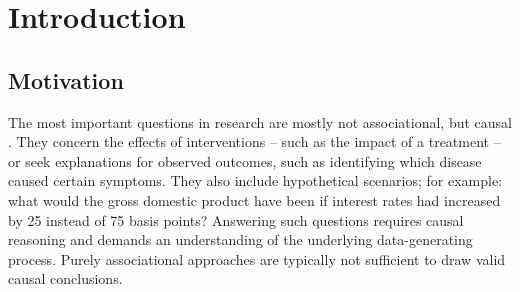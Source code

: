 




\chapter{Introduction}

\section{Motivation}


The most important questions in research are mostly not associational, but causal \citep{pearl2009}. They concern the effects of interventions -- such as the impact of a treatment -- or seek explanations for observed outcomes, such as identifying which disease caused certain symptoms. They also include hypothetical scenarios; for example: what would the gross domestic product have been if interest rates had increased by 25 instead of 75 basis points? Answering such questions requires causal reasoning and demands an understanding of the underlying data-generating process. Purely associational approaches are typically not sufficient to draw valid causal conclusions.




